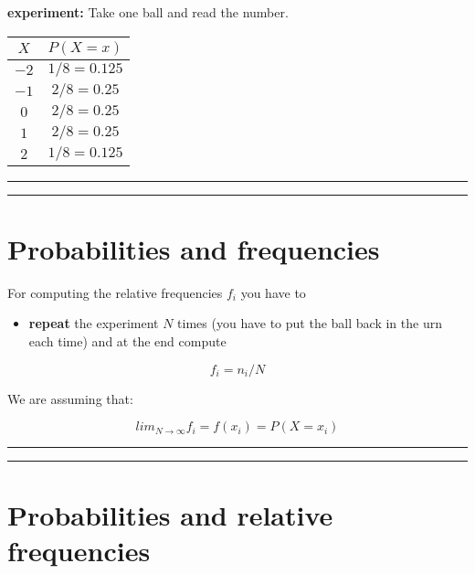 \documentclass[
]{book}
\providecommand{\tightlist}{%
  \setlength{\itemsep}{0pt}\setlength{\parskip}{0pt}}
\begin{document}
\textbf{experiment:} Take one ball and read the number.

\begin{longtable}[]{@{}cc@{}}
\toprule
\(X\) & \(P(X=x)\) \\
\midrule
\endhead
\(-2\) & \(1/8=0.125\) \\
\(-1\) & \(2/8=0.25\) \\
\(0\) & \(2/8=0.25\) \\
\(1\) & \(2/8=0.25\) \\
\(2\) & \(1/8=0.125\) \\
\bottomrule
\end{longtable}

\begin{center}\rule{0.5\linewidth}{0.5pt}\end{center}

\begin{center}\rule{0.5\linewidth}{0.5pt}\end{center}

\hypertarget{probabilities-and-frequencies}{%
\section{Probabilities and frequencies}\label{probabilities-and-frequencies}}

For computing the relative frequencies \(f_i\) you have to

\begin{itemize}
\tightlist
\item
  \textbf{repeat} the experiment \(N\) times (you have to put the ball back in the urn each time) and at the end compute
\end{itemize}

\[f_i=n_i/N\]

We are assuming that:

\[lim_{N \rightarrow \infty} f_i = f(x_i)=P(X=x_i)\]

\begin{center}\rule{0.5\linewidth}{0.5pt}\end{center}

\begin{center}\rule{0.5\linewidth}{0.5pt}\end{center}

\hypertarget{probabilities-and-relative-frequencies}{%
\section{Probabilities and relative frequencies}\label{probabilities-and-relative-frequencies}}
\end{document}
